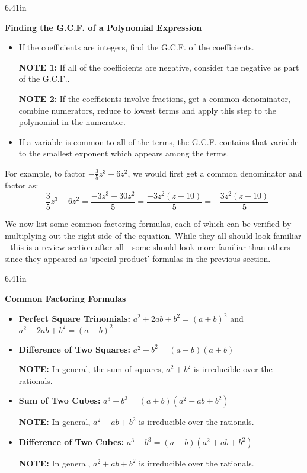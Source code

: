\documentclass[11pt]{article}
\theoremstyle{definition}  %
\newcommand{\bbm}{\begin{boxedminipage}{6.41in}}
\newcommand{\ebm}{\end{boxedminipage}}
\begin{document}
\medskip

\label{PolynomialGCF}
\colorbox{ResultColor}{\bbm
\centerline{\textbf{Finding the G.C.F. of a Polynomial Expression}}

\begin{itemize}

\item If the coefficients are integers, find the G.C.F. of the coefficients. 

\textbf{NOTE 1:}  If all of the coefficients are negative, consider the negative as part of the G.C.F..

\textbf{NOTE 2:}  If the coefficients involve fractions, get a common denominator, combine numerators, reduce to lowest terms and apply this step to the polynomial in the numerator.

\item  If a variable is common to all of the terms, the G.C.F. contains that variable to the smallest exponent which appears among the terms.

\end{itemize}

\ebm}

\smallskip

For example, to factor $-\frac{3}{5}z^3 - 6z^2$, we would first get a common denominator and factor as: \[ -\frac{3}{5}z^3 - 6z^2 = \frac{-3z^3 - 30z^2}{5} = \frac{-3z^2(z + 10)}{5} = -\frac{3z^2(z + 10)}{5}\]

We now list some common factoring formulas, each of which can be verified by multiplying out the right side of the equation.  While they all should look familiar - this is a review section after all - some should look more familiar than others since they appeared as `special product' formulas in the previous section.  

\medskip

\label{CommonFactoringFormulas}
\colorbox{ResultColor}{\bbm
\centerline{\textbf{Common Factoring Formulas}}

\begin{itemize}

\item \textbf{Perfect Square Trinomials:}  $a^2 + 2ab + b^2 = (a+b)^2$ and $a^2 - 2ab + b^2 = (a-b)^2$
\item  \textbf{Difference of Two Squares:}  $a^2 - b^2 = (a-b)(a+b)$

\textbf{NOTE:}  In general, the sum of squares, $a^2 + b^2$ is irreducible over the rationals.

\item  \textbf{Sum of Two Cubes:}  $a^3 + b^3 = (a + b)(a^2 - ab + b^2)$

\textbf{NOTE:}  In general, $a^2 - ab + b^2$ is irreducible over the rationals.

\item   \textbf{Difference of Two Cubes:}  $a^3 - b^3 = (a - b)(a^2 + ab + b^2)$ 

\textbf{NOTE:}  In general, $a^2 + ab + b^2$ is irreducible over the rationals.
\end{itemize}

\ebm}
\end{document}
